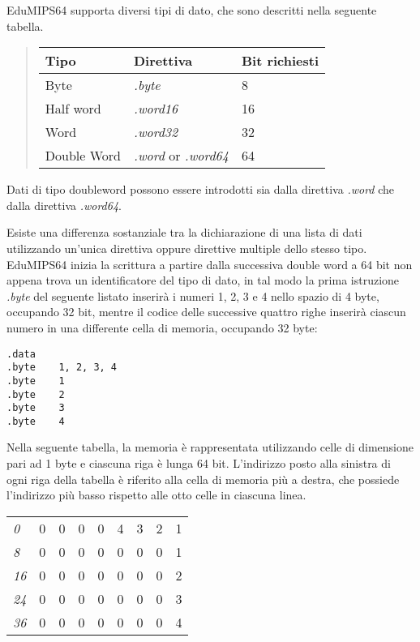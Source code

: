 \documentclass[letterpaper,10pt,english]{sphinxmanual}
\begin{document}
EduMIPS64 supporta diversi tipi di dato, che sono descritti nella seguente
tabella.
\begin{quote}

\begin{tabulary}{\linewidth}{|L|L|L|}
\hline
\textbf{
Tipo
} & \textbf{
Direttiva
} & \textbf{
Bit richiesti
}\\
\hline

Byte
 & 
\emph{.byte}
 & 
8
\\

Half word
 & 
\emph{.word16}
 & 
16
\\

Word
 & 
\emph{.word32}
 & 
32
\\

Double Word
 & 
\emph{.word} or \emph{.word64}
 & 
64
\\
\hline
\end{tabulary}

\end{quote}

Dati di tipo doubleword possono essere introdotti sia dalla direttiva
\emph{.word} che dalla direttiva \emph{.word64}.

Esiste una differenza sostanziale tra la dichiarazione di una lista di dati
utilizzando un'unica direttiva oppure direttive multiple dello stesso tipo.
EduMIPS64 inizia la scrittura a partire dalla successiva double word a 64 bit non appena
trova un identificatore del tipo di dato, in tal modo la prima istruzione \emph{.byte}
del seguente listato inserirà i numeri 1, 2, 3 e 4 nello spazio di 4 byte,
occupando 32 bit, mentre il codice delle successive quattro righe inserirà ciascun numero
in una differente cella di memoria, occupando 32 byte:

\begin{Verbatim}[commandchars=@\[\]]
.data
.byte    1, 2, 3, 4
.byte    1
.byte    2
.byte    3
.byte    4
\end{Verbatim}

Nella seguente tabella, la memoria è rappresentata utilizzando celle di dimensione pari
ad 1 byte e ciascuna riga è lunga 64 bit. L'indirizzo posto alla sinistra di ogni riga della tabella è
riferito alla cella di memoria più a destra, che possiede l'indirizzo più basso rispetto alle otto celle in ciascuna linea.

\begin{tabulary}{\linewidth}{|L|L|L|L|L|L|L|L|L|}
\hline

\emph{0}
 & 
0
 & 
0
 & 
0
 & 
0
 & 
4
 & 
3
 & 
2
 & 
1
\\

\emph{8}
 & 
0
 & 
0
 & 
0
 & 
0
 & 
0
 & 
0
 & 
0
 & 
1
\\

\emph{16}
 & 
0
 & 
0
 & 
0
 & 
0
 & 
0
 & 
0
 & 
0
 & 
2
\\

\emph{24}
 & 
0
 & 
0
 & 
0
 & 
0
 & 
0
 & 
0
 & 
0
 & 
3
\\

\emph{36}
 & 
0
 & 
0
 & 
0
 & 
0
 & 
0
 & 
0
 & 
0
 & 
4
\\
\hline
\end{tabulary}
\end{document}
